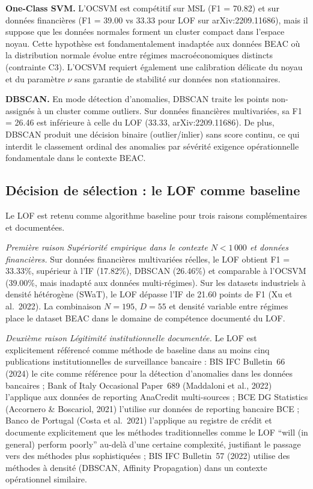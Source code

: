 \documentclass[12pt,a4paper]{article}
\begin{document}
\textbf{One-Class SVM.} L'OCSVM est compétitif sur MSL (F1 = 70.82) et sur
données financières (F1 = 39.00 vs 33.33 pour LOF sur arXiv:2209.11686), mais
il suppose que les données normales forment un cluster compact dans l'espace
noyau. Cette hypothèse est fondamentalement inadaptée aux données BEAC où la
distribution normale évolue entre régimes macroéconomiques distincts
(contrainte C3). L'OCSVM requiert également une calibration délicate du noyau
et du paramètre $\nu$ sans garantie de stabilité sur données non stationnaires.

\textbf{DBSCAN.} En mode détection d'anomalies, DBSCAN traite les points
non-assignés à un cluster comme outliers. Sur données financières multivariées,
sa F1 = 26.46 est inférieure à celle du LOF (33.33, arXiv:2209.11686). De
plus, DBSCAN produit une décision binaire (outlier/inlier) sans score continu,
ce qui interdit le classement ordinal des anomalies par sévérité  exigence
opérationnelle fondamentale dans le contexte BEAC.

\subsection{Décision de sélection : le LOF comme baseline}

Le LOF est retenu comme algorithme baseline pour trois raisons complémentaires
et documentées.

\textit{Première raison  Supériorité empirique dans le contexte
$N < 1\,000$ et données financières.} Sur données financières multivariées
réelles, le LOF obtient F1 = 33.33\%, supérieur à l'IF (17.82\%), DBSCAN
(26.46\%) et comparable à l'OCSVM (39.00\%, mais inadapté aux données
multi-régimes). Sur les datasets industriels à densité hétérogène (SWaT),
le LOF dépasse l'IF de 21.60 points de F1 (Xu et al.\ 2022). La combinaison
$N = 195$, $D = 55$ et densité variable entre régimes place le dataset BEAC
dans le domaine de compétence documenté du LOF.

\textit{Deuxième raison  Légitimité institutionnelle documentée.} Le LOF
est explicitement référencé comme méthode de baseline dans au moins cinq
publications institutionnelles de surveillance bancaire : BIS IFC Bulletin~66
(2024) le cite comme référence pour la détection d'anomalies dans les données
bancaires ; Bank of Italy Occasional Paper~689 (Maddaloni et al., 2022) l'applique
aux données de reporting AnaCredit multi-sources ; BCE DG Statistics
(Accornero \& Boscariol, 2021) l'utilise sur données de reporting bancaire BCE ;
Banco de Portugal (Costa et al.\ 2021) l'applique au registre de crédit et
documente explicitement que les méthodes traditionnelles comme le LOF
``will (in general) perform poorly'' au-delà d'une certaine complexité, justifiant
le passage vers des méthodes plus sophistiquées ; BIS IFC Bulletin~57 (2022)
utilise des méthodes à densité (DBSCAN, Affinity Propagation) dans un contexte
opérationnel similaire.
\end{document}

